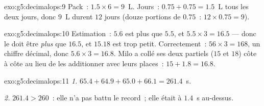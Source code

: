\begin{solution}{exo:g5:decimalops:9}
Pack~: $1.5 \times 6 = 9$~L. Jours~: $0.75 + 0.75 = 1.5$~L tous les
deux jours, donc $9$~L durent $12$ jours (douze portions de
$0.75$~: $12 \times 0.75 = 9$).
\end{solution}

\begin{solution}{exo:g5:decimalops:10}
Estimation~: $5.6$ est plus que $5.5$, et $5.5 \times 3 = 16.5$ ---
donc le  doit être \emph{plus} que $16.5$, et $15.18$ est
trop petit. Correctement~: $56 \times 3 = 168$, un chiffre décimal,
donc $5.6 \times 3 = 16.8$. Milo a collé ses deux  partiels
($15$ et $18$) côte à côte au lieu de les additionner avec leurs
places~: $15 + 1.8 = 16.8$.
\end{solution}

\begin{solution}{exo:g5:decimalops:11}
\emph{1.} $65.4 + 64.9 + 65.0 + 66.1 = 261.4$~s.

\emph{2.} $261.4 > 260$~: elle n'a pas battu le record~; elle
était à $1.4$~s au-dessus.
\end{solution}
